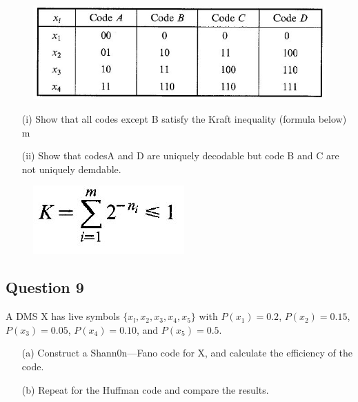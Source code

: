 \documentclass[a4paper,12pt]{article}
\begin{document}
\begin{figure}[h!]
\centering
\includegraphics[width=0.7\linewidth]{./12ACodes}
\caption{}
\label{fig:12ACodes}
\end{figure}



\begin{itemize}
\item[(i)] Show that all codes except B satisfy the Kraft inequality (formula below)
m
\item[(ii)] Show that codesA and D are uniquely decodable but code B and C are not
uniquely demdable.
\end{itemize}
\begin{figure}[h!]
\centering
\includegraphics[width=0.4\linewidth]{./12AKraftIneq}
\caption{}
\label{fig:12AKraftIneq}
\end{figure}


\subsection*{Question 9}
A DMS X has live symbols $\{x_l,x_2,x_3,x_4,x_5\}$ with $P(x_1) = 0.2$, $P(x_2)=0.15$, $P(x_3) =0.05$,
$P(x_4) = 0.10$, and $P(x_5) = 0.5$. 
\begin{itemize}
\item[(a)] Construct a Shann0n—Fano code for X, and calculate the efficiency of the code.
\item[(b)] Repeat for the Huffman code and compare the results.
\end{itemize}

 
\end{document}

